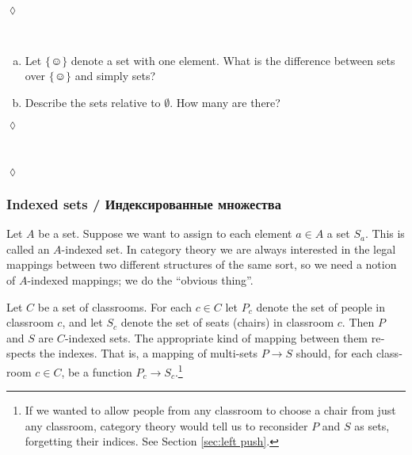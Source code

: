 \documentclass[a4paper]{book}
\def\singleton{\{\smiley\}}
\def\to{\rightarrow}
\theoremstyle{myth}
\newtheorem{exampleENG}[envENG]{\begin{english}Example\end{english}}
\newtheorem{excENG}[envENG]{\begin{english}Exercise\end{english}}
\newenvironment{exerciseENG}{\begin{excENG}}{\hspace*{\fill}$\lozenge$\end{excENG}}
\newtheorem{exampleRUS}[envRUS]{\begin{russian}Пример\end{russian}}
\newtheorem{excRUS}[envRUS]{\begin{russian}Упражнение\end{russian}}
\newenvironment{exerciseRUS}{\begin{excRUS}}{\hspace*{\fill}$\lozenge$\end{excRUS}}
\def\sexc{\begin{enumerate}[a.)]\setlength{\itemsep}{.1cm}\setlength{\parskip}{.1cm}\item}
\def\next{\item}
\def\endsexc{\end{enumerate}}
\begin{document}
\begin{english}
\begin{exerciseRUS}
\begin{russian} \end{russian}
\end{exerciseRUS}

\begin{exerciseENG}~
\sexc Let $\singleton$ denote a set with one element. What is the difference between sets over $\singleton$ and simply sets?
\next Describe the sets relative to $\emptyset$. How many are there?
\endsexc
\end{exerciseENG}

\begin{exerciseRUS}~
\begin{russian} \end{russian}
\end{exerciseRUS}


\subsubsection{Indexed sets / Индексированные множества}\label{sec:indexed sets}

Let $A$ be a set. Suppose we want to assign to each element $a\in A$ a set $S_a$. This is called an $A$-indexed set. In category theory we are always interested in the legal mappings between two different structures of the same sort, so we need a notion of $A$-indexed mappings; we do the “obvious thing”.

\begin{russian} \end{russian}

\begin{exampleENG}\label{ex:classroom seats}
Let $C$ be a set of classrooms. For each $c\in C$ let $P_c$ denote the set of people in classroom $c$, and let $S_c$ denote the set of seats (chairs) in classroom $c$. Then $P$ and $S$ are $C$-indexed sets. The appropriate kind of mapping between them respects the indexes. That is, a mapping of multi-sets $P\to S$ should, for each classroom $c\in C$, be a function $P_c\to S_c$.\footnote{If we wanted to allow people from any classroom to choose a chair from just any classroom, category theory would tell us to reconsider $P$ and $S$ as sets, forgetting their indices. See Section \ref{sec:left push}.}
\end{exampleENG}

\begin{exampleRUS}\label{ex:classroom seats}
\begin{russian} \end{russian}
\end{exampleRUS}


\end{english}
\end{document}
